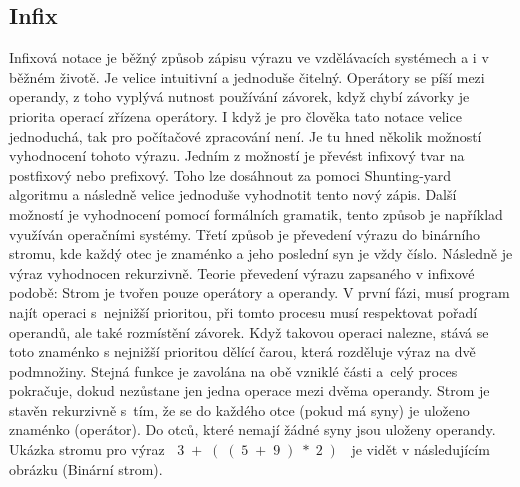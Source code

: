 \documentclass[12pt,a4paper]{report}
\begin{document}
\subsection{Infix}
Infixová notace je běžný způsob zápisu výrazu ve vzdělávacích systémech a i v běžném 
životě. Je velice intuitivní a jednoduše čitelný. Operátory se píší mezi operandy, z toho 
vyplývá nutnost používání závorek, když chybí závorky je priorita operací zřízena operátory. I když je pro člověka tato notace velice jednoduchá, tak pro počítačové zpracování není. Je tu hned několik možností vyhodnocení tohoto výrazu. Jedním z možností je převést infixový tvar na postfixový nebo prefixový. Toho lze dosáhnout za pomoci Shunting-yard \cite{výrazy} algoritmu a následně velice jednoduše vyhodnotit tento nový zápis. Další možností je vyhodnocení pomocí formálních gramatik, tento způsob je například využíván operačními systémy. Třetí způsob je převedení výrazu do binárního stromu, kde každý otec je znaménko a jeho poslední syn je vždy číslo. Následně je výraz vyhodnocen rekurzivně. 
\newline
\newline
Teorie převedení výrazu zapsaného v infixové podobě: 
\newline
Strom je tvořen pouze operátory a operandy. V první fázi, musí program najít operaci s~nejnižší prioritou, při tomto procesu musí respektovat pořadí operandů, ale také rozmístění závorek. Když takovou operaci nalezne, stává se toto znaménko s nejnižší prioritou dělící čarou, která rozděluje výraz na dvě podmnožiny. Stejná funkce je zavolána na obě vzniklé části a~celý proces pokračuje, dokud nezůstane jen jedna operace mezi dvěma operandy. Strom je stavěn rekurzivně s~tím, že se do každého otce (pokud má syny) je uloženo znaménko (operátor). Do otců, které nemají žádné syny jsou uloženy operandy. Ukázka stromu pro výraz $\;\;3\;+\;(\;(\;5\;+\;9\;)\;*\;2\;)\;\;$ je vidět v následujícím obrázku (Binární strom).
\end{document}
